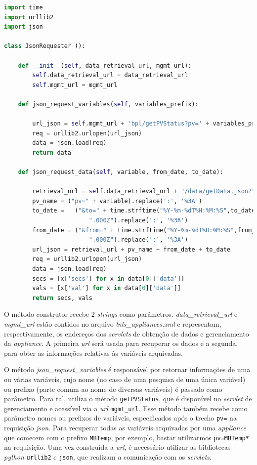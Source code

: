 \begin{lstlisting}[language=Python]
import time
import urllib2
import json

class JsonRequester ():
    
    def __init__(self, data_retrieval_url, mgmt_url):
        self.data_retrieval_url = data_retrieval_url
        self.mgmt_url = mgmt_url
    
    def json_request_variables(self, variables_prefix):
        
        url_json = self.mgmt_url + 'bpl/getPVStatus?pv=' + variables_prefix
        req = urllib2.urlopen(url_json)
        data = json.load(req)
        return data
    
    def json_request_data(self, variable, from_date, to_date):    
        
        retrieval_url = self.data_retrieval_url + "/data/getData.json?"
        pv_name = ("pv=" + variable).replace(':', '%3A')
        to_date =   ("&to=" + time.strftime("%Y-%m-%dT%H:%M:%S",to_date) + 
        				".000Z").replace(':', '%3A')
        from_date = ("&from=" + time.strftime("%Y-%m-%dT%H:%M:%S",from_date) + 
        				".000Z").replace(':', '%3A')    
        url_json = retrieval_url + pv_name + from_date + to_date
        req = urllib2.urlopen(url_json)
        data = json.load(req)
        secs = [x['secs'] for x in data[0]['data']]
        vals = [x['val'] for x in data[0]['data']]
        return secs, vals
\end{lstlisting}

O método construtor recebe 2 \textit{strings} como parâmetros.
\textit{data\_retrieval\_url} e \textit{mgmt\_url} estão contidos no arquivo
\textit{lnls\_appliances.xml} e representam, respectivamente, os endereços dos
\textit{servlets} de obtenção de dados e gerenciamento da \textit{appliance}. A
primeira \textit{url} será usada para recuperar os dados e a segunda, para obter
as informações relativas às variáveis arquivadas.

\vspace{12pt}

O método \textit{json\_request\_variables} é responsável por retornar
informações de uma ou várias variáveis, cujo nome (no caso de uma pesquisa de
uma única variável) ou prefixo (parte comum ao nome de diversas variáveis) é
passado como parâmetro. Para tal, utiliza o método \texttt{getPVStatus}, que é
disponível no \textit{servlet} de gerenciamento e acessível via a \textit{url}
\texttt{mgmt\_url}. Esse método também recebe como parâmetro nomes ou prefixos
de variáveis, especificados após o trecho \texttt{pv=} na requisição
\textit{json}. Para recuperar todas as variáveis arquivadas por uma
\textit{appliance} que comecem com o prefixo \texttt{MBTemp}, por exemplo,
bastar utilizarmos \texttt{pv=MBTemp*} na requisição. Uma vez construída a
\textit{url}, é necessário utilizar as bibliotecas \textit{python}
\texttt{urllib2} e \texttt{json}, que realizam a comunicação com os
\textit{servlets}. 

